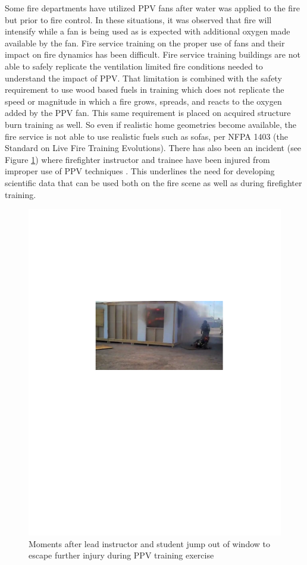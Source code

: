 \documentclass{article}
\begin{document}
Some fire departments have utilized PPV fans after water was applied to the fire but prior to fire control. In these situations, it was observed that fire will intensify while a fan is being used as is expected with additional oxygen made available by the fan. Fire service training on the proper use of fans and their impact on fire dynamics has been difficult. Fire service training buildings are not able to safely replicate the ventilation limited fire conditions needed to understand the impact of PPV. That limitation is combined with the safety requirement to use wood based fuels in training which does not replicate the speed or magnitude in which a fire grows, spreads, and reacts to the oxygen added by the PPV fan. This same requirement is placed on acquired structure burn training as well. So even if realistic home geometries become available, the fire service is not able to use realistic fuels such as sofas, per NFPA 1403 (the Standard on Live Fire Training Evolutions). There has also been an incident (see Figure \ref{fig:PPVTrainingInj}) where firefighter instructor and trainee have been injured from improper use of PPV techniques \cite{LasVegasNews_ChiefsRole}. This underlines the need for developing scientific data that can be used both on the fire scene as well as during firefighter training.

\begin{figure}[H]
	\centering
	\includegraphics[width = 5in]{0_Images/Background/PPVTrainingInjury.pdf}
	\caption{Moments after lead instructor and student jump out of window to escape further injury during PPV training exercise}
	\label{fig:PPVTrainingInj}
\end{figure}
\end{document}
